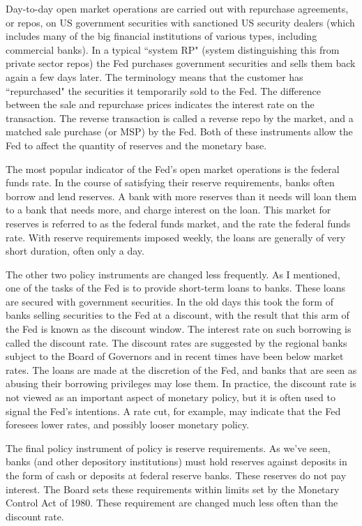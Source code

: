 \documentclass[letterpaper,12pt]{article}
\begin{document}
     Day-to-day open market operations are carried out with repurchase
agreements, or repos, on US government securities with sanctioned US security dealers (which
includes many of the big financial institutions of various types, including commercial banks).  In
a typical ``system RP" (system distinguishing this from private sector repos) the Fed purchases
government securities and sells them back again a few days later.  The terminology means that the
customer has ``repurchased" the securities it temporarily sold to the Fed.  The difference between
the sale and repurchase prices indicates the interest rate on the transaction.  The reverse
transaction is called a reverse repo by the market, and a matched sale purchase (or MSP) by the
Fed. Both of these instruments allow the Fed to affect the quantity of reserves and the monetary
base.

     The most popular indicator of the Fed's open market operations is the
federal funds rate.  In the course of satisfying their reserve requirements, banks often borrow
and lend reserves.  A bank with more reserves than it needs will loan them to a bank that needs
more, and charge interest on the loan.  This market for reserves is referred to as the federal
funds market, and the rate the federal funds rate.  With reserve requirements imposed weekly, the
loans are generally of very short duration, often only a day.

     The other two policy instruments are changed less frequently.  As I
mentioned, one of the tasks of the Fed is to provide short-term loans to banks.  These loans are
secured with government securities.  In the old days this took the form of banks selling
securities to the Fed at a discount, with the result that this arm of the Fed is known as the
discount window.  The interest rate on such borrowing is called the discount rate.  The discount
rates are suggested by the regional banks subject to the Board of Governors and in recent times
have been below market rates.  The loans are made at the discretion of the Fed, and banks that are
seen as abusing their borrowing privileges may lose them.  In practice, the discount rate is not
viewed as an important aspect of monetary policy, but it is often used to signal the Fed's
intentions.  A rate cut, for example, may indicate that the Fed foresees lower rates, and possibly
looser monetary policy.

     The final policy instrument of policy is reserve requirements.  As we've
seen, banks (and other depository institutions) must hold reserves against deposits in the form of
cash or deposits at federal reserve banks.  These reserves do not pay interest.  The Board sets
these requirements within limits set by the Monetary Control Act of 1980.  These requirement are
changed much less often than the discount rate.
\end{document}
